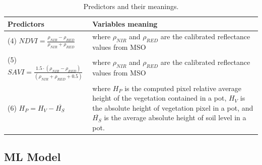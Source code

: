 \documentclass[12pt,a4paper,oneside]{report}
\begin{document}
\begin{table}[H]
    \centering
    \caption{Predictors and their meanings.}
    \begin{tabularx}{\textwidth}{XX}
    \toprule
    \textbf{Predictors} & \textbf{Variables meaning} \\
    \midrule
    (4) $NDVI = \frac{\rho_{NIR} - \rho_{RED}}{\rho_{NIR} + \rho_{RED}}$ & where $\rho_{NIR}$ and $\rho_{RED}$ are the calibrated reflectance values from MSO \\
    (5) $SAVI = \frac{1.5 \cdot (\rho_{NIR} - \rho_{RED})}{(\rho_{NIR} + \rho_{RED} + 0.5)}$ & where $\rho_{NIR}$ and $\rho_{RED}$ are the calibrated reflectance values from MSO \\
    (6) $H_P = H_V - \overline{H_S}$ & where $H_P$ is the computed pixel relative average height of the vegetation contained in a pot, $H_V$ is the absolute height of vegetation pixel in a pot, and $\overline{H_S}$ is the average absolute height of soil level in a pot. \\
    \bottomrule
    \end{tabularx}
    \label{tab:predictors}
\end{table}

\subsection{ML Model}
\end{document}

